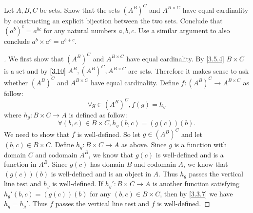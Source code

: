 \begin{ex}\label{ex:3.6.6}
	Let \(A, B, C\) be sets.
	Show that the sets \((A^B)^C\) and \(A^{B \times C}\) have equal cardinality by constructing an explicit bijection between the two sets.
	Conclude that \((a^b)^c = a^{bc}\) for any natural numbers \(a, b, c\).
	Use a similar argument to also conclude \(a^b \times a^c = a^{b+c}\).
\end{ex}

\begin{proof}[]
	We first show that \((A^B)^C\) and \(A^{B \times C}\) have equal cardinality.
	By \cref{3.5.4} \(B \times C\) is a set and by \cref{3.10} \(A^B, (A^B)^C, A^{B \times C}\) are sets.
	Therefore it makes sense to ask whether \((A^B)^C\) and \(A^{B \times C}\) have equal cardinality.
	Define \(f : (A^B)^C \to A^{B \times C}\) as follow:
	\[
		\forall g \in (A^B)^C, f(g) = h_g
	\]
	where \(h_g : B \times C \to A\) is defined as follow:
	\[
		\forall (b, c) \in B \times C, h_g(b, c) = (g(c))(b).
	\]
	We need to show that \(f\) is well-defined.
	So let \(g \in (A^B)^C\) and let \((b, c) \in B \times C\).
	Define \(h_g : B \times C \to A\) as above.
	Since \(g\) is a function with domain \(C\) and codomain \(A^B\), we know that \(g(c)\) is well-defined and is a function in \(A^B\).
	Since \(g(c)\) has domain \(B\) and codomain \(A\), we know that \((g(c))(b)\) is well-defined and is an object in \(A\).
	Thus \(h_g\) passes the vertical line test and \(h_g\) is well-defined.
	If \(h_g' : B \times C \to A\) is another function satisfying \(h_g'(b, c) = (g(c))(b)\) for any \((b, c) \in B \times C\), then by \cref{3.3.7} we have \(h_g = h_g'\).
	Thus \(f\) passes the vertical line test and \(f\) is well-defined.


\end{proof}

